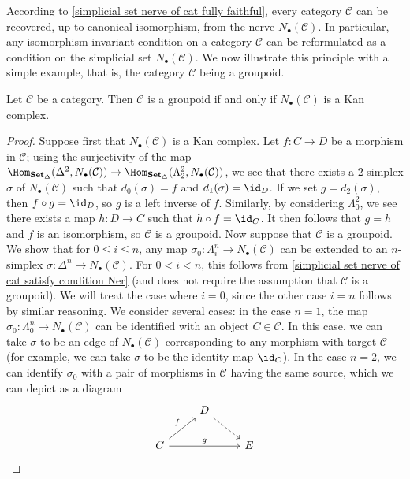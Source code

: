 According to \cref{simplicial set nerve of cat fully faithful}, every category $\mathcal{C}$ can be recovered, up to canonical isomorphism, from the nerve $N_\bullet(\mathcal{C})$. In particular, any isomorphism-invariant condition on a category $\mathcal{C}$ can be reformulated as a condition on the simplicial set $N_\bullet(\mathcal{C})$. We now illustrate this principle with a simple example, that is, the category $\mathcal{C}$ being a groupoid.
\begin{proposition}\label{simplicial set nerve of cat Kan iff groupoid}
Let $\mathcal{C}$ be a category. Then $\mathcal{C}$ is a groupoid if and only if $N_\bullet(\mathcal{C})$ is a Kan complex.
\end{proposition}
\begin{proof}
Suppose first that $N_\bullet(\mathcal{C})$ is a Kan complex. Let $f:C\to D$ be a morphism in $\mathcal{C}$; using the surjectivity of the map $\Hom_{\mathbf{Set}_\Delta}(\Delta^2,N_\bullet(\mathcal{C}))\to\Hom_{\mathbf{Set}_\Delta}(\Lambda^2_2,N_\bullet(\mathcal{C}))$, we see that there exists a $2$-simplex $\sigma$ of $N_\bullet(\mathcal{C})$ such that $d_0(\sigma)=f$ and $d_1(\sigma)=\id_D$. If we set $g=d_2(\sigma)$, then $f\circ g=\id_D$, so $g$ is a left inverse of $f$. Similarly, by considering $\Lambda^2_0$, we see there exists a map $h:D\to C$ such that $h\circ f=\id_C$. It then follows that $g=h$ and $f$ is an isomorphism, so $\mathcal{C}$ is a groupoid.
Now suppose that $\mathcal{C}$ is a groupoid. We show that for $0\leq i\leq n$, any map $\sigma_0:\Lambda_i^n\to N_\bullet(\mathcal{C})$ can be extended to an $n$-simplex $\sigma:\Delta^n\to N_\bullet(\mathcal{C})$. For $0<i<n$, this follows from \cref{simplicial set nerve of cat satisfy condition Ner} (and does not require the assumption that $\mathcal{C}$ is a groupoid). We will treat the case where $i=0$, since the other case $i=n$ follows by similar reasoning. We consider several cases: in the case $n=1$, the map $\sigma_0:\Lambda_0^n\to N_\bullet(\mathcal{C})$ can be identified with an object $C\in\mathcal{C}$. In this case, we can take $\sigma$ to be an edge of $N_\bullet(\mathcal{C})$ corresponding to any morphism with target $\mathcal{C}$ (for example, we can take $\sigma$ to be the identity map $\id_C$). In the case $n=2$, we can identify $\sigma_0$ with a pair of morphisms in $\mathcal{C}$ having the same source, which we can depict as a diagram
\[\begin{tikzcd}
&D\ar[rd,dashed]&\\
C\ar[ru,"f"]\ar[rr,"g"]&&E
\end{tikzcd}\]

\end{proof}
